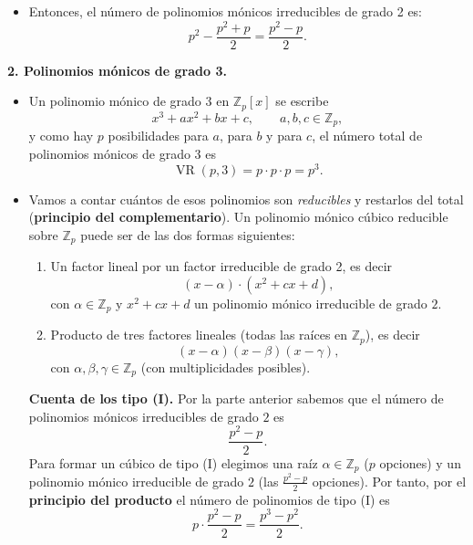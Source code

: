 \documentclass[a4paper,12pt]{article}
\begin{document}
\begin{ejercicio}[title=Ejercicio 28 (⋆)]
\begin{itemize}
\begin{itemize}
\item Sumando ambos tipos de polinomios reducibles obtenemos:
\[
\binom{p}{2} + p \;=\; \frac{p(p-1)}{2} + p \;=\; \frac{p^2 + p}{2}.
\]
\end{itemize}
\item Entonces, el número de polinomios mónicos irreducibles de grado 2 es:
\[
p^2 - \frac{p^2 + p}{2} = \boxed{\frac{p^2 - p}{2}}.
\]
\end{itemize}

\medskip
\textbf{2. Polinomios mónicos de grado 3.}

\begin{itemize}
\item Un polinomio mónico de grado 3 en $\mathbb{Z}_p[x]$ se escribe
\[
x^3 + a x^2 + b x + c,\qquad a,b,c\in\mathbb{Z}_p,
\]
y como hay $p$ posibilidades para $a$, para $b$ y para $c$, el número total de polinomios mónicos de grado 3 es
\[
\operatorname{VR}(p,3)=p\cdot p\cdot p = p^3.
\]

\item Vamos a contar cuántos de esos polinomios son \emph{reducibles} y restarlos del total (\textbf{principio del complementario}).  
Un polinomio mónico cúbico reducible sobre $\mathbb{Z}_p$ puede ser de las dos formas siguientes:

\begin{enumerate}
\item[(I)] {Un factor lineal por un factor irreducible de grado 2}, es decir
\[
(x-\alpha)\cdot (x^2+cx+d),
\]
con $\alpha\in\mathbb{Z}_p$ y $x^2+cx+d$ un polinomio mónico irreducible de grado $2$.

\item[(II)] {Producto de tres factores lineales} (todas las raíces en $\mathbb{Z}_p$), es decir
\[
(x-\alpha)(x-\beta)(x-\gamma),
\]
con $\alpha,\beta,\gamma\in\mathbb{Z}_p$ (con multiplicidades posibles).
\end{enumerate}

\bigskip

\textbf{Cuenta de los tipo (I).}  
Por la parte anterior sabemos que el número de polinomios mónicos irreducibles de grado $2$ es
\[
\frac{p^2-p}{2}.
\]
Para formar un cúbico de tipo (I) elegimos una raíz $\alpha\in\mathbb{Z}_p$ ($p$ opciones) y un polinomio mónico irreducible de grado $2$ (las $\frac{p^2-p}{2}$ opciones). Por tanto, por el \textbf{principio del producto} el número de polinomios de tipo (I) es
\[
p\cdot\frac{p^2-p}{2}=\frac{p^3-p^2}{2}.
\]

\end{itemize}
\end{ejercicio}
\end{document}
